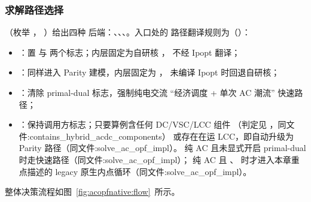 \subsubsection*{求解路径选择}
（枚举 ，
）给出四种
后端：、、、。入口处的
路径翻译规则为（）：
\begin{itemize}
  \item {}：置  与 
        两个标志；内层固定为自研核 ，
        不经 Ipopt 翻译；
  \item {}：同样进入 Parity 建模，内层固定为 ，
        未编译 Ipopt 时回退自研核；
  \item {}：清除 primal-dual 标志，强制纯电交流
        ``经济调度 + 单次 AC 潮流'' 快速路径；
  \item {}：保持调用方标志；只要算例含任何 DC/VSC/LCC 组件
        （判定见 ，同文件:contains\_hybrid\_acdc\_components）
        或存在在运 LCC，即自动升级为 Parity 路径（同文件:solve\_ac\_opf\_impl）。
        纯 AC 且未显式开启 primal-dual 时走快速路径（同文件:solve\_ac\_opf\_impl）；
        纯 AC 且 、
        时才进入本章重点描述的 legacy 原生内点循环（同文件:solve\_ac\_opf\_impl）。
\end{itemize}
整体决策流程如图~\ref{fig:acopfnative:flow}~所示。

